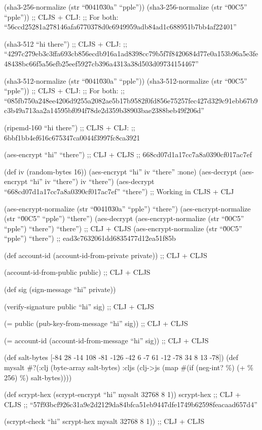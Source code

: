 \documentclass[
]{article}
\begin{document}
(sha3-256-normalize (str ``\u0041\u030a'' ``pple'')) (sha3-256-normalize
(str ``\u00C5'' ``pple'')) ;; CLJS + CLJ: ;; For both:
``56ccd25281a278146afa6770378d0c6949959adb84ad1c688951b7bb4af22401''

(sha3-512 ``hi there'') ;; CLJS + CLJ: ;;
``4297c279eb3c3ffa693cb856ecdb916a1ad8398cc79b5f7f8420684d77e0a153b96a5e3fe48438bc66f5a56efb25eef5927cb396a4313a38d503d09734154467''

(sha3-512-normalize (str ``\u0041\u030a'' ``pple'')) (sha3-512-normalize
(str ``\u00C5'' ``pple'')) ;; CLJS + CLJ: ;; For both: ;;
``085fb750a248ee4206d9255a2082ae5b17b9582f0fd856e75257fec427d329c91ebb67b9c3b49a713aa2a14595bf094f78de2d359b38903bae2388beb49f206d''

(ripemd-160 ``hi there'') ;; CLJS + CLJ: ;;
6bbf1bb4ef616c675347ca0044f3997fc8ca3921

(aes-encrypt ``hi'' ``there'') ;; CLJ + CLJS ;;
668cd07d1a17cc7a8a0390cf017ac7ef

(def iv (random-bytes 16)) (aes-encrypt ``hi'' iv ``there'' :none)
(aes-decrypt (aes-encrypt ``hi'' iv ``there'') iv ``there'')
(aes-decrypt ``668cd07d1a17cc7a8a0390cf017ac7ef'' ``there'') ;; Working
in CLJS + CLJ

(aes-encrypt-normalize (str ``\u0041\u030a'' ``pple'') ``there'')
(aes-encrypt-normalize (str ``\u00C5'' ``pple'') ``there'') (aes-decrypt
(aes-encrypt-normalize (str ``\u00C5'' ``pple'') ``there'') ``there'')
;; CLJ + CLJS (aes-encrypt-normalize (str ``\u00C5'' ``pple'')
``there'') ;; ead3c7632061dd6835477d12ea51f85b

(def account-id (account-id-from-private private)) ;; CLJ + CLJS

(account-id-from-public public) ;; CLJ + CLJS

(def sig (sign-message ``hi'' private))

(verify-signature public ``hi'' sig) ;; CLJ + CLJS

(= public (pub-key-from-message ``hi'' sig)) ;; CLJ + CLJS

(= account-id (account-id-from-message ``hi'' sig)) ;; CLJ + CLJS

(def salt-bytes {[}-84 28 -14 108 -81 -126 -42 6 -7 61 -12 -78 34 8 13
-78{]}) (def mysalt \#?(:clj (byte-array salt-bytes) :cljs
(clj-\textgreater js (map \#(if (neg-int? \%) (+ \% 256) \%)
salt-bytes))))

(def scrypt-hex (scrypt-encrypt ``hi'' mysalt 32768 8 1)) scrypt-hex ;;
CLJ + CLJS ;;
``57f93bcf926c31a9e2d2129da84bfca51eb9447dfe1749b62598feacaad657d4''

(scrypt-check ``hi'' scrypt-hex mysalt 32768 8 1)) ;; CLJ + CLJS
\end{document}
